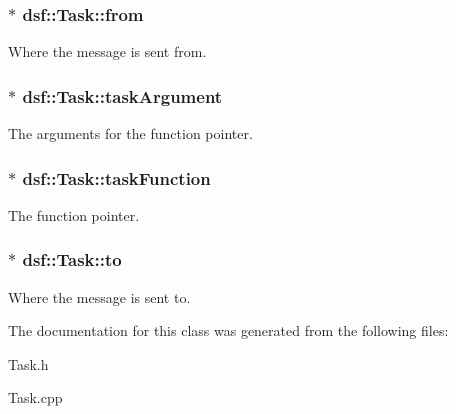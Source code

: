 \subsubsection[{from}]{$\ast$ dsf\+::\+Task\+::from}\label{classdsf_1_1_task_afc1faf30dab0d57501dfdcb4ef7b5450}
Where the message is sent from. \hypertarget{classdsf_1_1_task_a8a095d8a36668f6500d4df8c24dbef8d}{}
\subsubsection[{task\+Argument}]{$\ast$ dsf\+::\+Task\+::task\+Argument}\label{classdsf_1_1_task_a8a095d8a36668f6500d4df8c24dbef8d}
The arguments for the function pointer. \hypertarget{classdsf_1_1_task_a681617cab34fbae641c5b0cf4be46659}{}
\subsubsection[{task\+Function}]{$\ast$ dsf\+::\+Task\+::task\+Function}\label{classdsf_1_1_task_a681617cab34fbae641c5b0cf4be46659}
The function pointer. \hypertarget{classdsf_1_1_task_a36c485fbeb9c2330f5637b9d625cf01a}{}
\subsubsection[{to}]{$\ast$ dsf\+::\+Task\+::to}\label{classdsf_1_1_task_a36c485fbeb9c2330f5637b9d625cf01a}
Where the message is sent to. 

The documentation for this class was generated from the following files\+:\begin{DoxyCompactItemize}
\item 
Task.\+h\item 
Task.\+cpp\end{DoxyCompactItemize}
